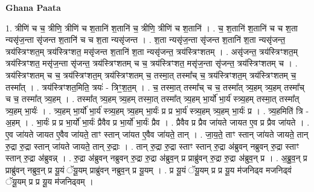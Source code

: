 \documentclass[17pt]{extarticle}
\begin{document}
\textbf{Ghana Paata } \newline

1. त्रीणि॑ च च॒ त्रीणि॒ त्रीणि॑ च श॒तानि॑ श॒तानि॑ च॒ त्रीणि॒ त्रीणि॑ च श॒तानि॑ । . च॒ श॒तानि॑ श॒तानि॑ च च श॒ता न्यसृ॑ज॒न्ता सृ॑जन्त श॒तानि॑ च च श॒ता न्यसृ॑जन्त । . श॒ता न्यसृ॑ज॒न्ता सृ॑जन्त श॒तानि॑ श॒ता न्यसृ॑जन्त॒ त्रय॑स्त्रिꣳशत॒म् त्रय॑स्त्रिꣳशत॒ मसृ॑जन्त श॒तानि॑ श॒ता न्यसृ॑जन्त॒ त्रय॑स्त्रिꣳशतम् । . असृ॑जन्त॒ त्रय॑स्त्रिꣳशत॒म् त्रय॑स्त्रिꣳशत॒ मसृ॑ज॒न्ता सृ॑जन्त॒ त्रय॑स्त्रिꣳशतम् च च॒ त्रय॑स्त्रिꣳशत॒ मसृ॑ज॒न्ता सृ॑जन्त॒ त्रय॑स्त्रिꣳशतम् च । . त्रय॑स्त्रिꣳशतम् च च॒ त्रय॑स्त्रिꣳशत॒म् त्रय॑स्त्रिꣳशतम् च॒ तस्मा॒त् तस्मा᳚च् च॒ त्रय॑स्त्रिꣳशत॒म् त्रय॑स्त्रिꣳशतम् च॒ तस्मा᳚त् । . त्रय॑स्त्रिꣳशत॒मिति॒ त्रयः॑ - त्रिꣳ॒॒श॒त॒म् । . च॒ तस्मा॒त् तस्मा᳚च् च च॒ तस्मा᳚त् त्र्य॒हम् त्र्य॒हम् तस्मा᳚च् च च॒ तस्मा᳚त् त्र्य॒हम् । . तस्मा᳚त् त्र्य॒हम् त्र्य॒हम् तस्मा॒त् तस्मा᳚त् त्र्य॒हम् भा॒र्यो॑ भा॒र्य॑ स्त्र्य॒हम् तस्मा॒त् तस्मा᳚त् त्र्य॒हम् भा॒र्यः॑ । . त्र्य॒हम् भा॒र्यो॑ भा॒र्य॑ स्त्र्य॒हम् त्र्य॒हम् भा॒र्यः॑ प्र प्र भा॒र्य॑ स्त्र्य॒हम् त्र्य॒हम् भा॒र्यः॑ प्र । . त्र्य॒हमिति॑ त्रि - अ॒हम् । . भा॒र्यः॑ प्र प्र भा॒र्यो॑ भा॒र्यः॑ प्रैवैव प्र भा॒र्यो॑ भा॒र्यः॑ प्रैव । . प्रैवैव प्र प्रैव जा॑यते जायत ए॒व प्र प्रैव जा॑यते । . ए॒व जा॑यते जायत ए॒वैव जा॑यते॒ ताꣳ स्तान् जा॑यत ए॒वैव जा॑यते॒ तान् । . जा॒य॒ते॒ ताꣳ स्तान् जा॑यते जायते॒ तान् रु॒द्रा रु॒द्रा स्तान् जा॑यते जायते॒ तान् रु॒द्राः । . तान् रु॒द्रा रु॒द्रा स्ताꣳ स्तान् रु॒द्रा अ॑ब्रुवन् नब्रुवन् रु॒द्रा स्ताꣳ स्तान् रु॒द्रा अ॑ब्रुवन्न् । . रु॒द्रा अ॑ब्रुवन् नब्रुवन् रु॒द्रा रु॒द्रा अ॑ब्रुव॒न् प्र प्राब्रु॑वन् रु॒द्रा रु॒द्रा अ॑ब्रुव॒न् प्र । . अ॒ब्रु॒व॒न् प्र प्राब्रु॑वन् नब्रुव॒न् प्र यू॒यं ॅयू॒यम् प्राब्रु॑वन् नब्रुव॒न् प्र यू॒यम् । . प्र यू॒यं ॅयू॒यम् प्र प्र यू॒य म॑जनिढ्व मजनिढ्वं ॅयू॒यम् प्र प्र यू॒य म॑जनिढ्वम् । \newline
\end{document}
